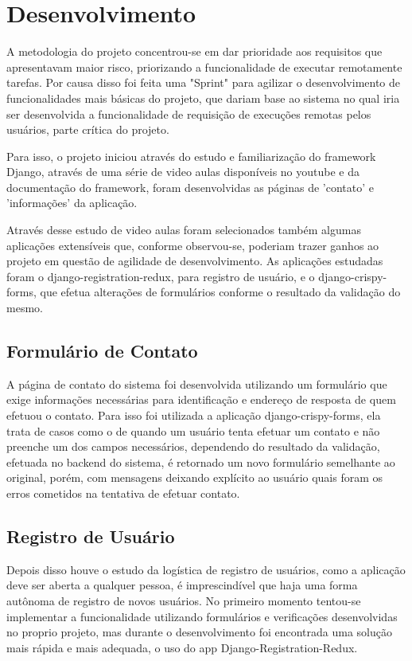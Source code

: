 \documentclass[tg]{mdtufsm}
\begin{document}
\chapter{Desenvolvimento}
A metodologia do projeto concentrou-se em dar prioridade aos requisitos que apresentavam maior risco, priorizando a funcionalidade de executar remotamente tarefas. Por causa disso foi feita uma "Sprint"  para agilizar o desenvolvimento de funcionalidades mais básicas do projeto, que dariam base ao sistema no qual iria ser desenvolvida a funcionalidade de requisição de execuções remotas pelos usuários, parte crítica do projeto.

Para isso, o projeto iniciou através do estudo e familiarização do framework Django, através de uma série de video aulas disponíveis no youtube e da documentação do framework, foram desenvolvidas as páginas de 'contato' e 'informações' da aplicação.

Através desse estudo de video aulas foram selecionados também algumas aplicações extensíveis que, conforme observou-se, poderiam trazer ganhos ao projeto em questão de agilidade de desenvolvimento. As aplicações estudadas foram o django-registration-redux, para registro de usuário, e o django-crispy-forms, que efetua alterações de formulários conforme o resultado da validação do mesmo.


\section{Formulário de Contato}
A página de contato do sistema foi desenvolvida utilizando um formulário que exige informações necessárias para identificação e endereço de resposta de quem efetuou o contato. Para isso foi utilizada a aplicação django-crispy-forms, ela trata de casos como o de quando um usuário tenta efetuar um contato e não preenche um dos campos necessários, dependendo do resultado da validação, efetuada no backend do sistema, é retornado um novo formulário semelhante ao original, porém, com mensagens deixando explícito ao usuário quais foram os erros cometidos na tentativa de efetuar contato.

\section{Registro de Usuário}
Depois disso houve o estudo da logística de registro de usuários, como a aplicação deve ser aberta a qualquer pessoa, é imprescindível que haja uma forma autônoma de registro de novos usuários. No primeiro momento tentou-se implementar a funcionalidade utilizando formulários e verificações desenvolvidas no proprio projeto, mas durante o desenvolvimento foi encontrada uma solução mais rápida e mais adequada, o uso do app Django-Registration-Redux.
\end{document}

